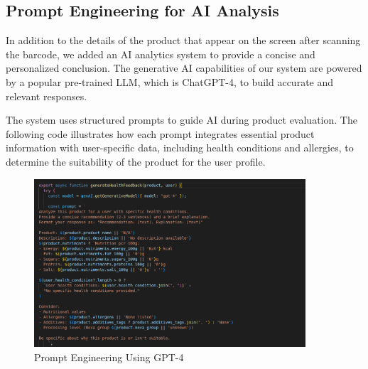 \subsection{Prompt Engineering for AI Analysis}
\par In addition to the details of the product that appear on the screen after scanning the barcode, we added an AI analytics system to provide a concise and personalized conclusion.
 The generative AI capabilities of our system are powered by a popular pre-trained LLM, which is ChatGPT-4, to build accurate and relevant responses.
 \par The system uses structured prompts to guide AI during product evaluation.
The following code illustrates how each prompt integrates essential product information with user-specific data, including health conditions and allergies, to determine the suitability of the product for the user profile.
\begin{center}
\begin{figure}[H]
    \includegraphics[width=0.9\textwidth]{images/prompt_engineering.png}
    \caption{Prompt Engineering Using GPT-4} 
    \label{fig:Prompt_Engineering}
\end{figure}
\end{center}

